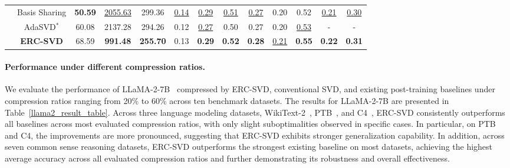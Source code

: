 \begin{table}[t]
{\begin{tabular}{c|c|ccc|cccccccc}
                               & \cellcolor{white} Basis Sharing & \cellcolor{white} \textbf{50.59} & \cellcolor{white} \underline{2055.63} & \cellcolor{white} 299.36 & \cellcolor{white} \underline{0.14} & \cellcolor{white} \underline{0.29} & \cellcolor{white} \underline{0.51} & \cellcolor{white} \underline{0.27} & \cellcolor{white} 0.20 & \cellcolor{white} 0.52 & \cellcolor{white} \underline{0.21} & \cellcolor{white} \underline{0.30} \\

                               & \cellcolor{white} AdaSVD$^{*}$ & \cellcolor{white} 60.08 & \cellcolor{white} 2137.28 & \cellcolor{white} 294.26 & \cellcolor{white} 0.12 & \cellcolor{white} \underline{0.27} & \cellcolor{white} 0.50 & \cellcolor{white} 0.27 & \cellcolor{white} 0.20 & \cellcolor{white} \underline{0.53} & \cellcolor{white} - & \cellcolor{white} -\\
        \cmidrule{2-13}    
                               & \cellcolor{cyan!10} \textbf{ERC-SVD} & \cellcolor{cyan!10} 68.59 & \cellcolor{cyan!10} \textbf{991.48} & \cellcolor{cyan!10} \textbf{255.70} & \cellcolor{cyan!10} 0.13 & \cellcolor{cyan!10} \textbf{0.29} & \cellcolor{cyan!10} \textbf{0.52} & \cellcolor{cyan!10} \textbf{0.28} & \cellcolor{cyan!10} \underline{0.21} & \cellcolor{cyan!10} \textbf{0.55} & \cellcolor{cyan!10} \textbf{0.22} & \cellcolor{cyan!10} \textbf{0.31} \\
    \bottomrule
\end{tabular}
}
\end{table}

\paragraph{Performance under different compression ratios.} 
We evaluate the performance of LLaMA-2-7B~\cite{touvron2023llama2} compressed by ERC-SVD, conventional SVD, and existing post-training baselines under compression ratios ranging from 20\% to 60\% across ten benchmark datasets. 
The results for LLaMA-2-7B are presented in Table~\ref{llama2_result_table}. 
Across three language modeling datasets, WikiText-2~\cite{merity2016pointer}, PTB~\cite{marcus1993building}, and C4~\cite{raffel2020exploring}, ERC-SVD consistently outperforms all baselines across most evaluated compression ratios, with only slight suboptimalities observed in specific cases. 
In particular, on PTB and C4, the improvements are more pronounced, suggesting that ERC-SVD exhibits stronger generalization capability. In addition, across seven common sense reasoning datasets, ERC-SVD outperforms the strongest existing baseline on most datasets, achieving the highest average accuracy across all evaluated compression ratios and further demonstrating its robustness and overall effectiveness.

